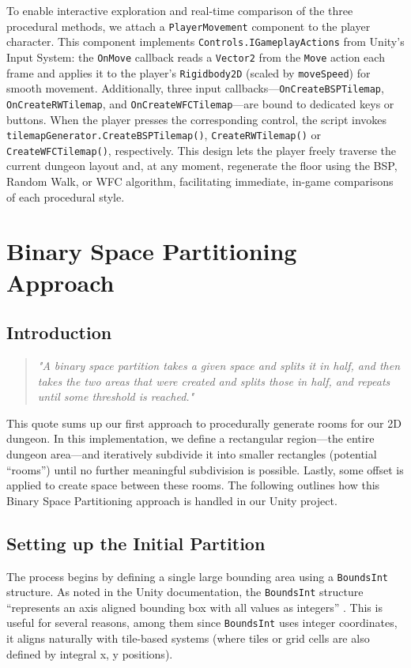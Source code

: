 \documentclass[a4paper, 12pt, one column, aas_macros]{article}
\begin{document}
To enable interactive exploration and real-time comparison of the three procedural methods, we attach a \texttt{PlayerMovement} component to the player character. This component implements \texttt{Controls.IGameplayActions} from Unity's Input System: the \texttt{OnMove} callback reads a \texttt{Vector2} from the \texttt{Move} action each frame and applies it to the player's \texttt{Rigidbody2D} (scaled by \texttt{moveSpeed}) for smooth movement. Additionally, three input callbacks---\texttt{OnCreateBSPTilemap}, \texttt{OnCreateRWTilemap}, and \texttt{OnCreateWFCTilemap}---are bound to dedicated keys or buttons. When the player presses the corresponding control, the script invokes \texttt{tilemapGenerator.CreateBSPTilemap()}, \texttt{CreateRWTilemap()} or \texttt{CreateWFCTilemap()}, respectively. This design lets the player freely traverse the current dungeon layout and, at any moment, regenerate the floor using the BSP, Random Walk, or WFC algorithm, facilitating immediate, in-game comparisons of each procedural style.

\section{Binary Space Partitioning Approach}
\subsection{Introduction}
\begin{quote}
  \emph{"A binary space partition takes a given space and splits it in half, and then takes the two areas that were created and splits those in half, and repeats until some threshold is reached."}
  \cite[p.~293]{ShortAdams2017}
\end{quote}

This quote sums up our first approach to procedurally generate rooms for our 2D dungeon. In this implementation, we define a rectangular region---the entire dungeon area---and iteratively subdivide it into smaller rectangles (potential ``rooms'') until no further meaningful subdivision is possible. Lastly, some offset is applied to create space between these rooms. The following outlines how this Binary Space Partitioning approach is handled in our Unity project.

\subsection{Setting up the Initial Partition}
The process begins by defining a single large bounding area using a \texttt{BoundsInt} structure. As noted in the Unity documentation, the \texttt{BoundsInt} structure ``represents an axis aligned bounding box with all values as integers'' \citep{unity_docs}. This is useful for several reasons, among them since \texttt{BoundsInt} uses integer coordinates, it aligns naturally with tile-based systems (where tiles or grid cells are also defined by integral x, y positions).
\end{document}
